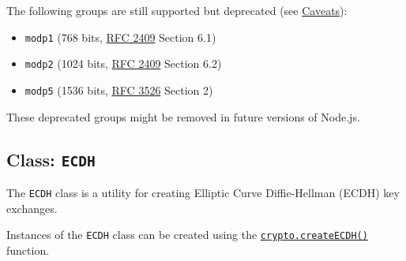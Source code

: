 The following groups are still supported but deprecated (see
\hyperref[support-for-weak-or-compromised-algorithms]{Caveats}):

\begin{itemize}
\tightlist
\item
  \texttt{\textquotesingle{}modp1\textquotesingle{}} (768 bits,
  \href{https://www.rfc-editor.org/rfc/rfc2409.txt}{RFC 2409} Section
  6.1) {}
\item
  \texttt{\textquotesingle{}modp2\textquotesingle{}} (1024 bits,
  \href{https://www.rfc-editor.org/rfc/rfc2409.txt}{RFC 2409} Section
  6.2) {}
\item
  \texttt{\textquotesingle{}modp5\textquotesingle{}} (1536 bits,
  \href{https://www.rfc-editor.org/rfc/rfc3526.txt}{RFC 3526} Section 2)
  {}
\end{itemize}

These deprecated groups might be removed in future versions of Node.js.

\subsection{\texorpdfstring{Class:
\texttt{ECDH}}{Class: ECDH}}\label{class-ecdh}

The \texttt{ECDH} class is a utility for creating Elliptic Curve
Diffie-Hellman (ECDH) key exchanges.

Instances of the \texttt{ECDH} class can be created using the
\hyperref[cryptocreateecdhcurvename]{\texttt{crypto.createECDH()}}
function.

